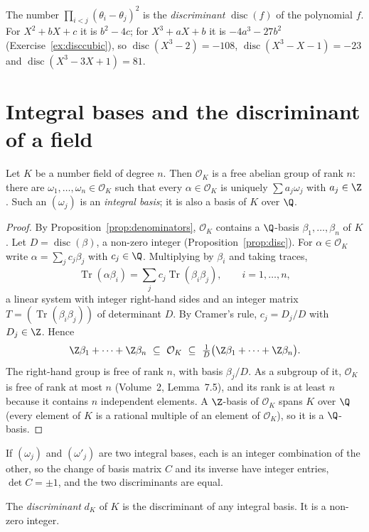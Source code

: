 The number $\prod_{i<j}(\theta_i-\theta_j)^2$ is the \emph{discriminant} $\operatorname{disc}(f)$ of the polynomial
$f$. For $X^2+bX+c$ it is $b^2-4c$; for $X^3+aX+b$ it is $-4a^3-27b^2$ (Exercise~\ref{ex:disccubic}), so
$\operatorname{disc}(X^3-2)=-108$, $\operatorname{disc}(X^3-X-1)=-23$ and $\operatorname{disc}(X^3-3X+1)=81$.

\section{Integral bases and the discriminant of a field}

\begin{theorem}\label{thm:intbasis}
Let $K$ be a number field of degree $n$. Then $\mathcal O_K$ is a free abelian group of rank $n$: there are
$\omega_1,\dots,\omega_n\in\mathcal O_K$ such that every $\alpha\in\mathcal O_K$ is uniquely $\sum a_j\omega_j$ with
$a_j\in\Z$. Such an $(\omega_j)$ is an \emph{integral basis}; it is also a basis of $K$ over $\Q$.
\end{theorem}
\begin{proof}
By Proposition~\ref{prop:denominators}, $\mathcal O_K$ contains a $\Q$-basis $\beta_1,\dots,\beta_n$ of $K$. Let
$D=\operatorname{disc}(\beta)$, a non-zero integer (Proposition~\ref{prop:disc}). For $\alpha\in\mathcal O_K$ write
$\alpha=\sum_jc_j\beta_j$ with $c_j\in\Q$. Multiplying by $\beta_i$ and taking traces,
\[
\operatorname{Tr}(\alpha\beta_i)=\sum_jc_j\operatorname{Tr}(\beta_i\beta_j),\qquad i=1,\dots,n,
\]
a linear system with integer right-hand sides and an integer matrix $T=(\operatorname{Tr}(\beta_i\beta_j))$ of
determinant $D$. By Cramer's rule, $c_j=D_j/D$ with $D_j\in\Z$. Hence
\[
\Z\beta_1+\dots+\Z\beta_n\ \subseteq\ \mathcal O_K\ \subseteq\ \tfrac1D\bigl(\Z\beta_1+\dots+\Z\beta_n\bigr).
\]
The right-hand group is free of rank $n$, with basis $\beta_j/D$. As a subgroup of it, $\mathcal O_K$ is free of rank
at most $n$ (Volume~2, Lemma~7.5), and its rank is at least $n$ because it contains $n$ independent elements. A $\Z$-basis
of $\mathcal O_K$ spans $K$ over $\Q$ (every element of $K$ is a rational multiple of an element of $\mathcal O_K$), so
it is a $\Q$-basis.
\end{proof}

If $(\omega_j)$ and $(\omega'_j)$ are two integral bases, each is an integer combination of the other, so the change of
basis matrix $C$ and its inverse have integer entries, $\det C=\pm1$, and the two discriminants are equal.

\begin{definition}
The \emph{discriminant} $d_K$ of $K$ is the discriminant of any integral basis. It is a non-zero integer.
\end{definition}


